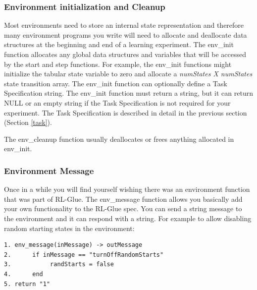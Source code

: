 \documentclass[11pt]{article}
\begin{document}

%

        
\subsubsection{Environment initialization and Cleanup}        
Most environments need to store an internal state representation and therefore many environment programs you write will need to allocate and deallocate data structures at the beginning and end of a learning experiment. The env\_init function allocates any global data structures and variables that will be accessed by the start and step functions. For example, the env\_init functions might initialize the tabular state variable to zero and allocate a {\it numStates X numStates} state transition array. The env\_init function can optionally define a Task Specification string. The env\_init function must return a string, but it can return NULL or an empty string if the Task Specification is not required for your experiment. The Task Specification is described in detail in the previous section (Section \ref{task}).

The env\_cleanup function usually deallocates or frees anything allocated in env\_init.

\subsubsection{Environment Message}
Once in a while you will find yourself wishing there was an environment function that was part of RL-Glue. The env\_message function allows you basically add your own functionality to the RL-Glue spec. You can send a string message to the environment and it can respond with a string. For example to allow disabling random starting states in the environment:
\begin{verbatim}
1. env_message(inMessage) -> outMessage
2.      if inMessage == "turnOffRandomStarts"  
3.           randStarts = false
4.      end 
5. return "1"
\end{verbatim}
\end{document}
